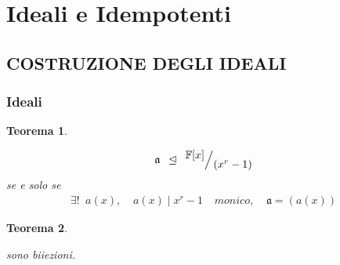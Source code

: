 \documentclass[mathserif]{beamer}
\def\quotient#1#2{%
   \raise1ex\hbox{$#1$}\Big/\lower1ex\hbox{$#2$}%
}
\newtheorem{teorema}{Teorema}
\begin{document}
\section{Ideali e Idempotenti}
\subsection{COSTRUZIONE DEGLI IDEALI}
\begin{frame}
  \frametitle{Ideali}
   \begin{teorema}
   \begin{center}
      \begin{align*}
	  \mathfrak{a}\phantom{a} \unlhd \phantom{a} \quotient{\mathbb{F} \lbrack x \rbrack  }{ (x^{r} - 1)} \\
	  \end{align*}
	  se e solo se
	  \begin{align*}
	      \exists ! \phantom{a}  a(x),   \phantom{aa}
	      a(x) \mid x^r - 1 \phantom{aa} monico, \phantom{aa} \mathfrak{a} = (a(x))
	\end{align*}
   \end{center}
   \end{teorema}
\end{frame}

\begin{frame}
   \begin{teorema}
   \begin{center}
   \end{center}
   sono biiezioni.
   \end{teorema}
\end{frame}
\end{document}
